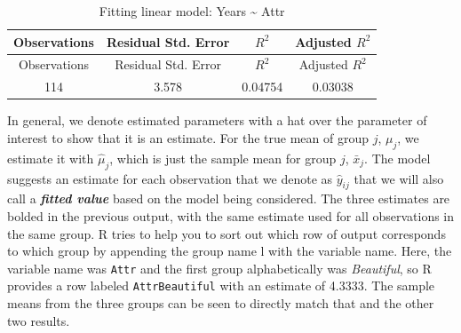 \documentclass[]{book}
\begin{document}
\begin{longtable}[]{@{}cccc@{}}
\caption{Fitting linear model: Years \textasciitilde{}
Attr}\tabularnewline
\toprule
\begin{minipage}[b]{0.18\columnwidth}\centering\strut
Observations\strut
\end{minipage} & \begin{minipage}[b]{0.27\columnwidth}\centering\strut
Residual Std. Error\strut
\end{minipage} & \begin{minipage}[b]{0.10\columnwidth}\centering\strut
\(R^2\)\strut
\end{minipage} & \begin{minipage}[b]{0.20\columnwidth}\centering\strut
Adjusted \(R^2\)\strut
\end{minipage}\tabularnewline
\midrule
\endfirsthead
\toprule
\begin{minipage}[b]{0.18\columnwidth}\centering\strut
Observations\strut
\end{minipage} & \begin{minipage}[b]{0.27\columnwidth}\centering\strut
Residual Std. Error\strut
\end{minipage} & \begin{minipage}[b]{0.10\columnwidth}\centering\strut
\(R^2\)\strut
\end{minipage} & \begin{minipage}[b]{0.20\columnwidth}\centering\strut
Adjusted \(R^2\)\strut
\end{minipage}\tabularnewline
\midrule
\endhead
\begin{minipage}[t]{0.18\columnwidth}\centering\strut
114\strut
\end{minipage} & \begin{minipage}[t]{0.27\columnwidth}\centering\strut
3.578\strut
\end{minipage} & \begin{minipage}[t]{0.10\columnwidth}\centering\strut
0.04754\strut
\end{minipage} & \begin{minipage}[t]{0.20\columnwidth}\centering\strut
0.03038\strut
\end{minipage}\tabularnewline
\bottomrule
\end{longtable}

In general, we denote estimated parameters with a hat over the parameter
of interest to show that it is an estimate. For the true mean of group
\(j\), \(\mu_j\), we estimate it with \(\hat{\mu}_j\), which is just the
sample mean for group \(j\), \(\bar{x}_j\). The model suggests an
estimate for each observation that we denote as \(\hat{y}_{ij}\) that we
will also call a \textbf{\emph{fitted value}} based on the model being
considered. The three estimates are bolded in the previous output, with
the same estimate used for all observations in the same group. R tries
to help you to sort out which row of output corresponds to which group
by appending the group name l with the variable name. Here, the variable
name was \texttt{Attr} and the first group alphabetically was
\emph{Beautiful}, so R provides a row labeled \texttt{AttrBeautiful}
with an estimate of 4.3333. The sample means from the three groups can
be seen to directly match that and the other two results.
\end{document}
